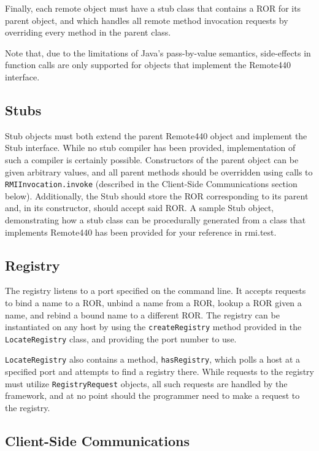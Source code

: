 \documentclass{scrartcl}
\begin{document}
Finally, each remote object must have a stub class that contains a ROR for its parent object, and which handles all remote method invocation requests by overriding every method in the parent class.

Note that, due to the limitations of Java's pass-by-value semantics, side-effects in function calls are only supported for objects that implement the Remote440 interface.

\subsection{Stubs}

Stub objects must both extend the parent Remote440 object and implement the Stub interface.  While no stub compiler has been provided, implementation of such a compiler is certainly possible.  Constructors of the parent object can be given arbitrary values, and all parent methods should be overridden using calls to \verb$RMIInvocation.invoke$ (described in the Client-Side Communications section below).  Additionally, the Stub should store the ROR corresponding to its parent and, in its constructor, should accept said ROR.  A sample Stub object, demonstrating how a stub class can be procedurally generated from a class that implements Remote440 has been provided for your reference in rmi.test.

\subsection{Registry}

The registry listens to a port specified on the command line.  It accepts requests to bind a name to a ROR, unbind a name from a ROR, lookup a ROR given a name, and rebind a bound name to a different ROR.  The registry can be instantiated on any host by using the \verb$createRegistry$ method provided in the \verb$LocateRegistry$ class, and providing the port number to use.

\verb$LocateRegistry$ also contains a method, \verb$hasRegistry$, which polls a host at a specified port and attempts to find a registry there.  While requests to the registry must utilize \verb$RegistryRequest$ objects, all such requests are handled by the framework, and at no point should the programmer need to make a request to the registry.

\subsection{Client-Side Communications}
\end{document}
